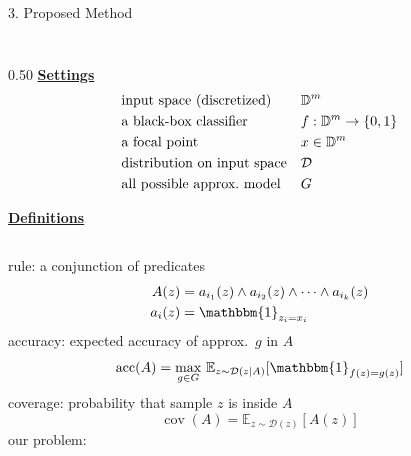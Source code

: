 \documentclass[unicode]{beamer}
\begin{document}
\begin{frame}
\begin{columns}[t]
\begin{column}{\rcol\textwidth}
\begin{block}{3. Proposed Method}
\begin{columns}[]
\begin{column}{0.3\textwidth}
\begin{figure}
            \end{figure}
          \end{column}
        \end{columns}

        \vspace{1.0em}
        \begin{columns}[t]
          \def\lcol{0.50}
          \def\rcol{0.48}
          \begin{column}{\lcol\textwidth}
            \underline{\textbf{Settings}}
            \begin{align*}
               & \text{input space (discretized)}   &  & \mathbb{D}^{m}             \\
               & \text{a black-box classifier}      &  & f:\mathbb{D}^{m}\to\{0,1\} \\
               & \text{a focal point}               &  & x\in\mathbb{D}^{m}         \\
               & \text{distribution on input space} &  & \mathcal{D}         \\
               & \text{all possible approx.\ model} &  & G
            \end{align*}

            \vspace{0.8em}
            \underline{\textbf{Definitions}}

            \vspace{1.0em}
            \begin{columns}
              \begin{column}{0.95\textwidth}
                rule: a conjunction of predicates
                \begin{align*}
                  A(z)   & =a_{i_1}(z)\wedge a_{i_2}(z)\wedge\dots\wedge a_{i_k}(z) \\
                  a_i(z) & =\mathbbm{1}_{z_i=x_i}
                \end{align*}
                accuracy: expected accuracy of approx.\ $g$ in $A$
                \begin{equation*}
                  \Prec(A)=\underset{g\in G}{\max}
                  \ \mathbb{E}_{z\sim\mathcal{D}(z|A)}[\mathbbm{1}_{f(z)=g(z)}]
                \end{equation*}
                coverage: probability that sample $z$ is inside $A$
                \begin{equation*}
                  \operatorname{cov}(A)=
                  \mathbb{E}_{z\sim\mathcal{D}(z)}[A(z)]
                \end{equation*}
                our problem:


\end{column}
\end{columns}
\end{column}
\end{columns}
\end{block}
\end{column}
\end{columns}
\end{frame}
\end{document}
